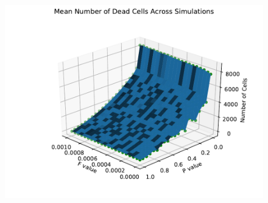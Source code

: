 \documentclass{article}
\begin{document}
\begin{figure}[H]
\centering
\includegraphics[scale=0.6]{Dead Mean 3D 2.pdf}
\label{fig:deadmean3D}
\end{figure}
\end{document}
